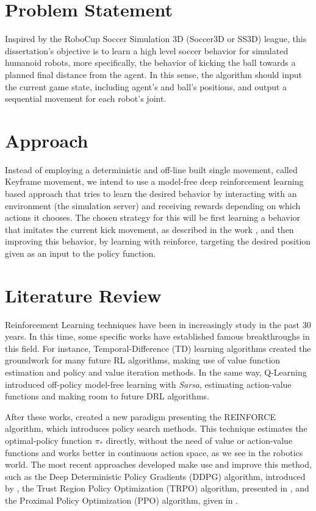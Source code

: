 \section{Problem Statement}

Inspired by the RoboCup Soccer Simulation 3D (Soccer3D or SS3D) league, this dissertation's objective is to learn a high level soccer behavior for simulated humanoid robots, more specifically, the behavior of kicking the ball towards a planned final distance from the agent. In this sense, the algorithm should input the current game state, including agent's and ball's positions, and output a sequential movement for each robot's joint.

\section{Approach}

Instead of employing a deterministic and off-line built single movement, called Keyframe movement, we intend to use a model-free deep reinforcement learning based approach that tries to learn the desired behavior by interacting with an environment (the simulation server) and receiving rewards depending on which actions it chooses.
The chosen strategy for this will be first learning a behavior that imitates the current kick movement, as described in the work \cite{deepmimic}, and then improving this behavior, by learning with reinforce, targeting the desired position given as an input to the policy function.

\section{Literature Review}

Reinforcement Learning techniques have been in increasingly study in the past 30 years. In this time, some specific works have established  famous breakthroughs in this field. For instance, Temporal-Difference (TD) learning algorithms \cite{TDLearning} created the groundwork for many future RL algorithms, making use of value function estimation and policy and value iteration methods. In the same way, Q-Learning \cite{QLearning} introduced off-policy model-free learning with \textit{Sarsa}, estimating action-value functions and making room to future DRL algorithms.

After these works,  created a new paradigm presenting the REINFORCE algorithm, which introduces policy search methods. This technique estimates the optimal-policy function $\pi_*$ directly, without the need of value or action-value functions and works better in continuous action space, as we see in the robotics world. The most recent approaches developed make use and improve this method, such as the Deep Deterministic Policy Gradients (DDPG) algorithm, introduced by \cite{DDPG}, the Trust Region Policy Optimization (TRPO) algorithm, presented in \cite{TRPO}, and the Proximal Policy Optimization (PPO) algorithm, given in \cite{PPO}.

